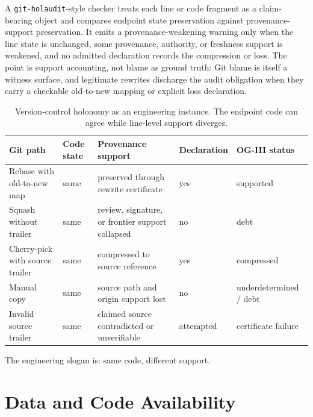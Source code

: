 \documentclass[11pt,twoside]{article}
\newcommand{\OGSchemaTableFont}{\footnotesize}
\newcommand{\OGTableHeaderRow}{\rowcolor{tableheaderbg}}
\newcommand{\TableHeaderRow}{\OGTableHeaderRow}
\newenvironment{OGTable}[2][ht]{%
  \begin{table}[#1]
  \centering
  #2
  \renewcommand{\arraystretch}{1.08}%
  \rowcolors{2}{tablerowbg}{white}%
}{%
  \rowcolors{2}{}{}%
  \end{table}%
}
\theoremstyle{definition}
\begin{document}
A \texttt{git-holaudit}-style checker treats each line or code fragment as a
claim-bearing object and compares endpoint state preservation against
provenance-support preservation. It emits a provenance-weakening warning only when the
line state is unchanged, some provenance, authority, or freshness support is
weakened, and no admitted declaration records the compression or loss. The
point is support accounting, not blame as ground truth: Git blame is itself a
witness surface, and legitimate rewrites discharge the audit obligation when
they carry a checkable old-to-new mapping or explicit loss declaration.

\begin{OGTable}{\OGSchemaTableFont}
\begin{tabularx}{\textwidth}{@{}>{\raggedright\arraybackslash}p{}>{\raggedright\arraybackslash}p{}>{\raggedright\arraybackslash}X>{\raggedright\arraybackslash}p{}>{\raggedright\arraybackslash}p{}@{}}
\toprule
\TableHeaderRow \textbf{Git path} & \textbf{Code state} & \textbf{Provenance support} & \textbf{Declaration} & \textbf{OG-III status} \\
\midrule
Rebase with old-to-new map & same & preserved through rewrite certificate & yes & supported \\
Squash without trailer & same & review, signature, or frontier support collapsed & no & debt \\
Cherry-pick with source trailer & same & compressed to source reference & yes & compressed \\
Manual copy & same & source path and origin support lost & no & underdetermined / debt \\
Invalid source trailer & same & claimed source contradicted or unverifiable & attempted & certificate failure \\
\bottomrule
\end{tabularx}
\caption{Version-control holonomy as an engineering instance. The endpoint code can agree while line-level support diverges.}
\label{tab:version-control-holonomy}
\end{OGTable}
\FloatBarrier

The engineering slogan is: same code, different support.

\section{Data and Code Availability}
\label{sec:availability}
\end{document}
